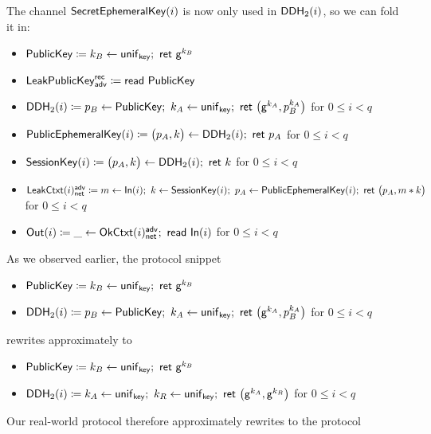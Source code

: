 \noindent The channel $\mathsf{SecretEphemeralKey}(i)$ is now only used in $\mathsf{DDH}_2(i)$, so we can fold it in:

\begin{itemize}
\item $\mathsf{PublicKey} \coloneqq k_B \leftarrow \mathsf{unif}_{\mathsf{key}}; \ \mathsf{ret} \ \mathsf{g}^{k_B}$
\item $\mathsf{LeakPublicKey}^{\mathsf{rec}}_{\mathsf{adv}} \coloneqq \mathsf{read} \ \mathsf{PublicKey}$
\item {\color{red} $\DDH_2(i) \coloneqq p_B \leftarrow \PublicKey; \ k_A \leftarrow \unif_\key; \ \ret{\big(\gen^{k_A}, p_B^{k_A}\big)}$ for $0 \leq i < q$}
\item $\mathsf{PublicEphemeralKey}(i) \coloneqq \big(p_A, k\big) \leftarrow \mathsf{DDH}_2(i); \ \mathsf{ret} \ p_A$ for $0 \leq i < q$
\item $\mathsf{SessionKey}(i) \coloneqq \big(p_A, k\big) \leftarrow \mathsf{DDH}_2(i); \ \mathsf{ret} \ k$ for $0 \leq i < q$
\item $\mathsf{LeakCtxt}(i)^{\mathsf{adv}}_{\mathsf{net}} \coloneqq m \leftarrow \mathsf{In}(i); \ k \leftarrow \mathsf{SessionKey}(i); \ p_A \leftarrow \mathsf{PublicEphemeralKey}(i); \ \mathsf{ret} \ \big(p_A, m * k\big)$ for $0 \leq i < q$
\item $\mathsf{Out}(i) \coloneqq \_ \leftarrow \mathsf{OkCtxt}(i)^{\mathsf{adv}}_{\mathsf{net}}; \ \mathsf{read} \ \mathsf{In}(i)$ for $0 \leq i < q$
\end{itemize}

\noindent As we observed earlier, the protocol snippet

\begin{itemize}
\item $\mathsf{PublicKey} \coloneqq k_B \leftarrow \mathsf{unif}_{\mathsf{key}}; \ \mathsf{ret} \ \mathsf{g}^{k_B}$
\item $\DDH_2(i) \coloneqq p_B \leftarrow \PublicKey; \ k_A \leftarrow \unif_\key; \ \ret{\big(\gen^{k_A}, p_B^{k_A}\big)}$ for $0 \leq i < q$
\end{itemize}

\noindent rewrites approximately to

\begin{itemize}
\item $\mathsf{PublicKey} \coloneqq k_B \leftarrow \mathsf{unif}_{\mathsf{key}}; \ \mathsf{ret} \ \mathsf{g}^{k_B}$
\item $\mathsf{DDH}_2(i) \coloneqq k_A \leftarrow \mathsf{unif}_{\mathsf{key}}; \ k_R \leftarrow \mathsf{unif}_{\mathsf{key}}; \ \mathsf{ret} \ \big(\mathsf{g}^{k_A}, \mathsf{g}^{k_R}\big)$ for $0 \leq i < q$
\end{itemize}

\noindent Our real-world protocol therefore approximately rewrites to the protocol

